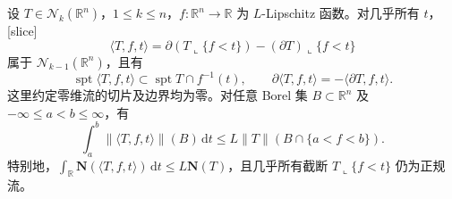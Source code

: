 \begin{theorem}\label{g3:thm:normal-current-slicing}
	设 \(T\in\mathcal N_k(\mathbb R^n)\)，\(1\le k\le n\)，\(f:\mathbb R^n\to\mathbb R\) 为 \(L\)-Lipschitz 函数。对几乎所有 \(t\)，[slice]
	\begin{equation}\label{g3:eq:current-slice-definition}
		\langle T,f,t\rangle
		=\partial(T\llcorner\{f<t\})-(\partial T)\llcorner\{f<t\}
	\end{equation}
	属于 \(\mathcal N_{k-1}(\mathbb R^n)\)，且有
	\[
		\operatorname{spt}\langle T,f,t\rangle
		\subset\operatorname{spt}T\cap f^{-1}(t),
		\qquad
		\partial\langle T,f,t\rangle=-\langle\partial T,f,t\rangle.
	\]
	这里约定零维流的切片及边界均为零。对任意 Borel 集 \(B\subset\mathbb R^n\) 及 \(-\infty\le a<b\le\infty\)，有
	\begin{equation}\label{g3:eq:normal-slice-mass}
		\int_a^b\|\langle T,f,t\rangle\|(B)\,\mathrm dt
		\le L\|T\|(B\cap\{a<f<b\}).
	\end{equation}
	特别地，\(\int_{\mathbb R}\mathbf N(\langle T,f,t\rangle)\,\mathrm dt\le L\mathbf N(T)\)，且几乎所有截断 \(T\llcorner\{f<t\}\) 仍为正规流。
\end{theorem}
